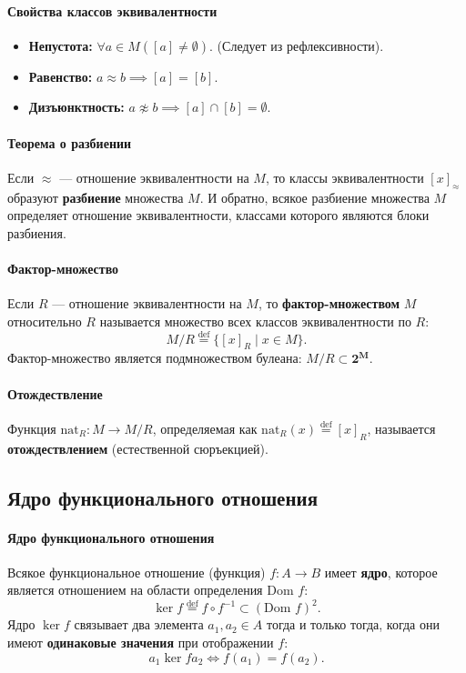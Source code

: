 \paragraph{Свойства классов эквивалентности}
\begin{itemize}
    \item \textbf{Непустота:} $\forall a \in M ([a] \ne \emptyset)$. (Следует из рефлексивности).
    \item \textbf{Равенство:} $a \approx b \implies [a] = [b]$.
    \item \textbf{Дизъюнктность:} $a \not\approx b \implies [a] \cap [b] = \emptyset$.
\end{itemize}

\paragraph{Теорема о разбиении}
Если $\approx$ --- отношение эквивалентности на $M$, то классы эквивалентности $[x]_\approx$ образуют \textbf{разбиение} множества $M$. И обратно, всякое разбиение множества $M$ определяет отношение эквивалентности, классами которого являются блоки разбиения.

\paragraph{Фактор-множество}
Если $R$ --- отношение эквивалентности на $M$, то \textbf{фактор-множеством} $M$ относительно $R$ называется множество всех классов эквивалентности по $R$:
$$M/R \stackrel{\text{def}}{=} \{[x]_R \mid x \in M\}.$$
Фактор-множество является подмножеством булеана: $M/R \subset \mathbf{2^M}$.

\paragraph{Отождествление}
Функция $\text{nat}_R: M \to M/R$, определяемая как $\text{nat}_R(x) \stackrel{\text{def}}{=} [x]_R$, называется \textbf{отождествлением} (естественной сюръекцией).

\subsection*{Ядро функционального отношения}

\paragraph{Ядро функционального отношения}
Всякое функциональное отношение (функция) $f: A \to B$ имеет \textbf{ядро}, которое является отношением на области определения $\text{Dom } f$:
$$\ker f \stackrel{\text{def}}{=} f \circ f^{-1} \subset (\text{Dom } f)^2.$$
Ядро $\ker f$ связывает два элемента $a_1, a_2 \in A$ тогда и только тогда, когда они имеют \textbf{одинаковые значения} при отображении $f$:
$$a_1 \ker f a_2 \iff f(a_1) = f(a_2).$$

